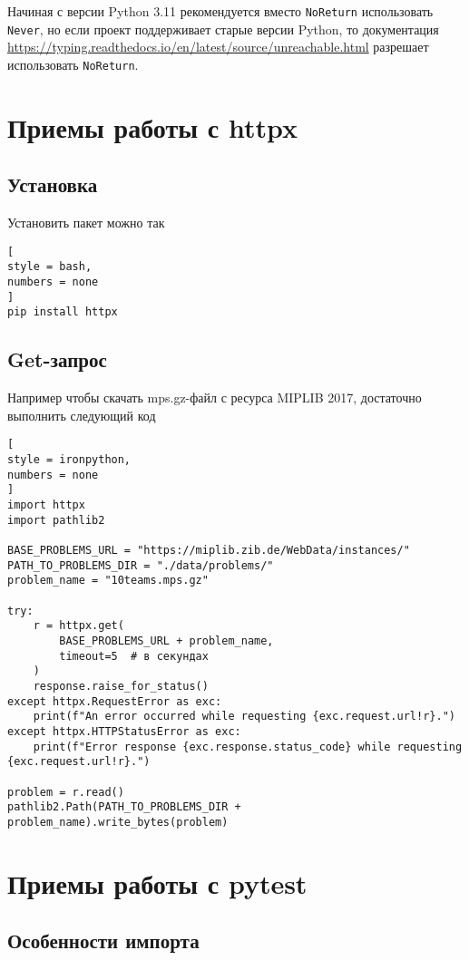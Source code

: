 \documentclass[%
	11pt,
	a4paper,
	utf8,
		]{article}
\begin{document}
Начиная с версии Python 3.11 рекомендуется вместо \verb*|NoReturn| использовать \verb*|Never|, но если проект поддерживает старые версии Python, то документация \url{https://typing.readthedocs.io/en/latest/source/unreachable.html} разрешает использовать \verb*|NoReturn|.

\section{Приемы работы с httpx}

\subsection{Установка}

Установить пакет можно так
\begin{lstlisting}[
style = bash,
numbers = none
]
pip install httpx
\end{lstlisting}

\subsection{Get-запрос}

Например чтобы скачать mps.gz-файл с ресурса MIPLIB 2017, достаточно выполнить следующий код
\begin{lstlisting}[
style = ironpython,
numbers = none
]
import httpx
import pathlib2

BASE_PROBLEMS_URL = "https://miplib.zib.de/WebData/instances/"
PATH_TO_PROBLEMS_DIR = "./data/problems/"
problem_name = "10teams.mps.gz"

try:
	r = httpx.get(
	    BASE_PROBLEMS_URL + problem_name,
	    timeout=5  # в секундах
	)
	response.raise_for_status()
except httpx.RequestError as exc:
    print(f"An error occurred while requesting {exc.request.url!r}.")
except httpx.HTTPStatusError as exc:
    print(f"Error response {exc.response.status_code} while requesting {exc.request.url!r}.")

problem = r.read()
pathlib2.Path(PATH_TO_PROBLEMS_DIR + problem_name).write_bytes(problem)
\end{lstlisting}

\section{Приемы работы с pytest}

\subsection{Особенности импорта}
\end{document}

